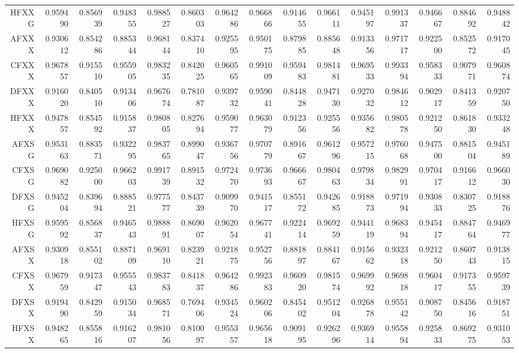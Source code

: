 {\begin{tabular}{rrrrrrrrrrrrrrr}
	HFXXG & 0.959490 & 0.856939 & 0.948355 & 0.988527 & 0.860303 & 0.964286 & 0.966866 & 0.914655 & 0.966111 & 0.945197 & 0.991337 & 0.946667 & 0.884692 & 0.948842 \\ 
	AFXXX & 0.930612 & 0.854286 & 0.885344 & 0.968144 & 0.837410 & 0.925595 & 0.950175 & 0.879885 & 0.885648 & 0.913356 & 0.971717 & 0.922500 & 0.852572 & 0.917045 \\ 
	CFXXX & 0.967857 & 0.915510 & 0.955905 & 0.983235 & 0.842025 & 0.960565 & 0.991009 & 0.959483 & 0.981481 & 0.969533 & 0.993394 & 0.958333 & 0.907971 & 0.960874 \\ 
	DFXXX & 0.916020 & 0.840510 & 0.913406 & 0.967674 & 0.781087 & 0.939732 & 0.959041 & 0.844828 & 0.947130 & 0.927032 & 0.984612 & 0.902917 & 0.841359 & 0.920750 \\ 
	HFXXX & 0.947857 & 0.854592 & 0.915837 & 0.980805 & 0.827694 & 0.959077 & 0.963079 & 0.912356 & 0.925556 & 0.935682 & 0.980578 & 0.921250 & 0.861830 & 0.933248 \\ 
	AFXSG & 0.953163 & 0.883571 & 0.932295 & 0.983765 & 0.899047 & 0.936756 & 0.970779 & 0.891667 & 0.961296 & 0.957215 & 0.976068 & 0.947500 & 0.881504 & 0.945189 \\ 
	CFXSG & 0.969082 & 0.925000 & 0.966203 & 0.991739 & 0.891532 & 0.972470 & 0.973693 & 0.966667 & 0.980463 & 0.979834 & 0.982991 & 0.970417 & 0.916612 & 0.966030 \\ 
	DFXSG & 0.945204 & 0.839694 & 0.888521 & 0.977577 & 0.843739 & 0.909970 & 0.941517 & 0.855172 & 0.942685 & 0.918873 & 0.971994 & 0.930833 & 0.830725 & 0.918876 \\ 
	HFXSG & 0.959592 & 0.856837 & 0.946543 & 0.988891 & 0.869007 & 0.962054 & 0.967741 & 0.922414 & 0.969259 & 0.944119 & 0.968394 & 0.945417 & 0.884764 & 0.946977 \\ 
	AFXSX & 0.930918 & 0.855102 & 0.887109 & 0.969110 & 0.823921 & 0.921875 & 0.952756 & 0.881897 & 0.884167 & 0.915662 & 0.932318 & 0.921250 & 0.860743 & 0.913815 \\ 
	CFXSX & 0.967959 & 0.917347 & 0.955543 & 0.983783 & 0.841837 & 0.964286 & 0.992383 & 0.960920 & 0.981574 & 0.969992 & 0.969818 & 0.960417 & 0.917355 & 0.959739 \\ 
	DFXSX & 0.919490 & 0.842959 & 0.915034 & 0.968571 & 0.769406 & 0.934524 & 0.960206 & 0.845402 & 0.951204 & 0.926878 & 0.955142 & 0.908750 & 0.845616 & 0.918751 \\ 
	HFXSX & 0.948265 & 0.855816 & 0.916207 & 0.981056 & 0.810097 & 0.955357 & 0.965618 & 0.909195 & 0.926296 & 0.936914 & 0.955894 & 0.925833 & 0.869275 & 0.931053 \\ 
	\hline
\end{tabular}
}
